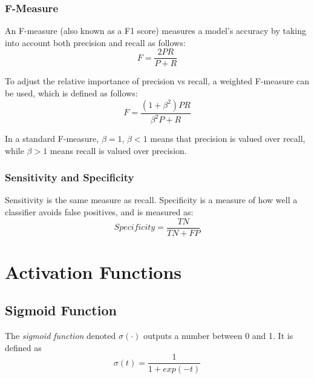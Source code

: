 \documentclass[12pt]{article}
\begin{document}
        \subsubsection{F-Measure}
            An F-measure (also known as a F1 score) measures a model's accuracy by taking into account both precision and recall as follows:
            $$F = \frac{2PR}{P + R}$$
    
            To adjust the relative importance of precision vs recall, a weighted F-measure can be used, which is defined as follows:
            $$F = \frac{(1 + \beta^2)PR}{\beta^2 P + R}$$
    
            In a standard F-measure, $\beta = 1$, $\beta < 1$ means that precision is valued over recall, while $\beta > 1$ means recall is valued over precision.
    
        \subsubsection{Sensitivity and Specificity}
            Sensitivity is the same measure as recall. Specificity is a measure of how well a classifier avoids false positives, and is measured as:
            $$Specificity = \frac{TN}{TN + FP}$$

\section{Activation Functions}
    \subsection{Sigmoid Function}
        The \textit{sigmoid function} denoted $\sigma(\cdot)$ outputs a number between 0 and 1. It is defined as
        $$ \sigma(t) = \frac{1}{1 + exp(-t)} $$

\end{document}
